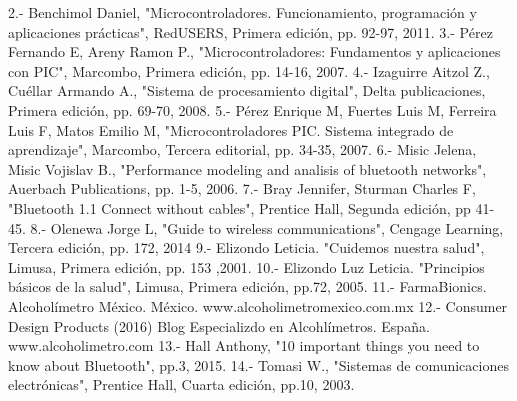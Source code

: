 2.- Benchimol Daniel, "Microcontroladores. Funcionamiento, programación y aplicaciones prácticas", RedUSERS, Primera edición, pp. 92-97, 2011.
3.- Pérez Fernando E, Areny Ramon P., "Microcontroladores: Fundamentos y aplicaciones con PIC", Marcombo, Primera edición, pp. 14-16, 2007.
4.- Izaguirre Aitzol Z., Cuéllar Armando A., "Sistema de procesamiento digital", Delta publicaciones, Primera edición, pp. 69-70, 2008.
5.- Pérez Enrique M, Fuertes Luis M, Ferreira Luis F, Matos Emilio M, "Microcontroladores PIC. Sistema integrado de aprendizaje", Marcombo, Tercera editorial, pp. 34-35, 2007.
6.- Misic Jelena, Misic Vojislav B., "Performance modeling and analisis of bluetooth networks", Auerbach Publications, pp. 1-5, 2006.
7.- Bray Jennifer, Sturman Charles F, "Bluetooth 1.1 Connect without cables", Prentice Hall, Segunda edición, pp 41-45.
8.- Olenewa Jorge L, "Guide to wireless communications", Cengage Learning, Tercera edición, pp. 172, 2014
9.- Elizondo Leticia. "Cuidemos nuestra salud", Limusa, Primera edición, pp. 153 ,2001.
10.- Elizondo Luz Leticia. "Principios básicos de la salud", Limusa, Primera edición, pp.72, 2005.
11.- FarmaBionics. Alcoholímetro México. México.  www.alcoholimetromexico.com.mx
12.- Consumer Design Products (2016) Blog Especializdo en Alcohlímetros. España. www.alcoholimetro.com
13.- Hall Anthony, "10 important things you need to know about Bluetooth", pp.3, 2015.
14.- Tomasi W., "Sistemas de comunicaciones electrónicas", Prentice Hall, Cuarta edición, pp.10, 2003.
